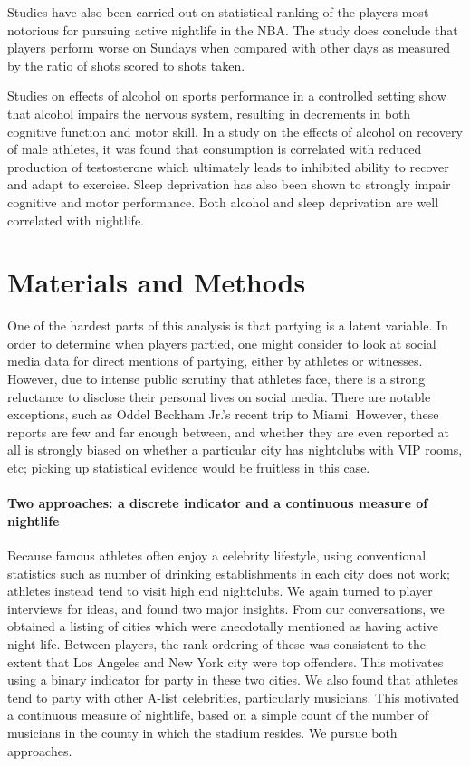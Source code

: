 \documentclass[letterpaper,12pt]{article}
\begin{document}
Studies have also been carried out on statistical ranking of the players
most notorious for pursuing active nightlife in the NBA.\cite{chase} The study
does conclude that players perform worse on Sundays when compared with other days
as measured by the ratio of shots scored to shots taken.

Studies on effects of alcohol on sports performance in a controlled setting
show that alcohol impairs the nervous system, resulting in decrements in both
cognitive function and motor skill.\cite{shirreffs} In a study on 
the effects of alcohol on recovery of male athletes, it was found that
consumption is correlated with reduced production of testosterone
which ultimately leads to inhibited ability to recover and adapt to exercise.\cite{mjbarnes}
Sleep deprivation has also been shown to strongly impair cognitive and motor performance.\cite{pilcher} Both alcohol and sleep deprivation are well correlated with nightlife.

\section{Materials and Methods}
One of the hardest parts of this analysis is that partying is a latent variable.
In order to determine when players partied, one might consider to look at social media data
for direct mentions of partying, either by athletes or witnesses. However, due to
intense public scrutiny that athletes face, there is a strong reluctance to disclose
their personal lives on social media. There are notable exceptions, such
as Oddel Beckham Jr.'s recent trip to Miami.\cite{bleler}
However, these reports are few and far enough between,
and whether they are even reported at all is strongly biased on whether a particular city 
has nightclubs with VIP rooms, etc; picking up statistical evidence would be fruitless in this case.

\paragraph{Two approaches: a discrete indicator and a continuous measure of nightlife}
Because famous athletes often enjoy a celebrity lifestyle, using conventional statistics
such as number of drinking establishments in each city does not work; athletes instead
tend to visit high end nightclubs. We again turned to player interviews for ideas,
and found two major insights. From our conversations, 
we obtained a listing of cities which were anecdotally
mentioned as having active night-life. Between players, the rank ordering of these
was consistent to the extent that Los Angeles and New York city were top
offenders. This motivates using a binary indicator for party in these two cities. 
We also found that athletes tend to party with other A-list celebrities,
particularly musicians. This motivated a continuous measure of nightlife, based on a
simple count of the number of musicians in the county in which the stadium resides. 
We pursue both approaches.
\end{document}
